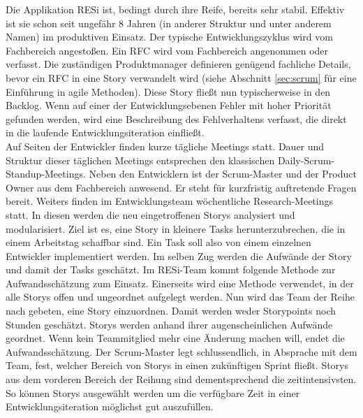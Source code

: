 Die Applikation RESi ist, bedingt durch ihre Reife, bereits sehr stabil. Effektiv ist sie schon seit ungefähr 8 Jahren (in anderer Struktur und unter anderem Namen) im produktiven Einsatz. Der typische Entwicklungszyklus wird vom Fachbereich angestoßen. Ein \gls{RFC} wird vom Fachbereich angenommen oder verfasst. Die zuständigen Produktmanager definieren genügend fachliche Details, bevor ein \gls{RFC} in eine \gls{Story} verwandelt wird (siehe Abschnitt \ref{sec:scrum} für eine Einführung in agile Methoden). Diese \gls{Story} fließt nun typischerweise in den \gls{Backlog}. Wenn auf einer der Entwicklungsebenen Fehler mit hoher Priorität gefunden werden, wird eine Beschreibung des Fehlverhaltens verfasst, die direkt in die laufende Entwicklungsiteration einfließt.\\
Auf Seiten der Entwickler finden kurze tägliche Meetings statt. Dauer und Struktur dieser täglichen Meetings entsprechen den klassischen Daily-Scrum-Standup-Meetings. Neben den Entwicklern ist der Scrum-Master und der Product Owner aus dem Fachbereich anwesend. Er steht für kurzfristig auftretende Fragen bereit. Weiters finden im Entwicklungsteam wöchentliche Research-Meetings statt. In diesen werden die neu eingetroffenen Storys analysiert und modularisiert. Ziel ist es, eine Story in kleinere Tasks herunterzubrechen, die in einem Arbeitstag schaffbar sind. Ein Task soll also von einem einzelnen Entwickler implementiert werden. Im selben Zug werden die Aufwände der Story und damit der Tasks geschätzt. Im RESi-Team kommt folgende Methode zur Aufwandsschätzung zum Einsatz. Einerseits wird eine Methode verwendet, in der alle Storys offen und ungeordnet aufgelegt werden. Nun wird das Team der Reihe nach gebeten, eine Story einzuordnen. Damit werden weder Storypoints noch Stunden geschätzt. Storys werden anhand ihrer augenscheinlichen Aufwände geordnet. Wenn kein Teammitglied mehr eine Änderung machen will, endet die Aufwandsschätzung. Der Scrum-Master legt schlussendlich, in Absprache mit dem Team, fest, welcher Bereich von Storys in einen zukünftigen Sprint fließt. Storys aus dem vorderen Bereich der Reihung sind dementsprechend die zeitintensivsten. So können Storys ausgewählt werden um die verfügbare Zeit in einer Entwicklungsiteration möglichst gut auszufüllen.

